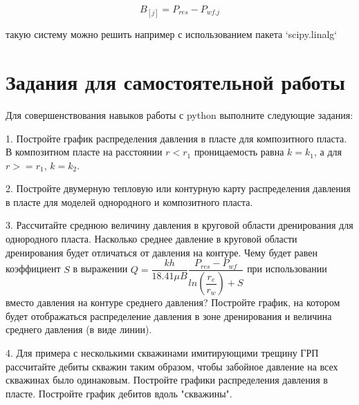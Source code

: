 $$
B_{[j]}=P_{res} - P_{wf.j}
$$

такую систему можно решить например с использованием пакета `scipy.linalg` 

\section{Задания для самостоятельной работы}

Для совершенствования навыков работы с python выполните следующие задания:

1. Постройте график распределения давления в пласте для композитного пласта. В композитном пласте на расстоянии $r<r_1$ проницаемость равна $k=k_1$, а для $r>=r_1$, $k=k_2$. 

2. Постройте двумерную тепловую или контурную карту распределения давления в пласте для моделей однородного и композитного пласта.

3. Рассчитайте среднюю величину давления в круговой области дренирования для однородного пласта. Насколько среднее давление в круговой области дренирования будет отличаться от давления на контуре. Чему будет равен коэффициент $S$ в выражении  $Q=\dfrac{kh}{18.41\mu B} \dfrac{P_{res}-P_{wf}}{ln(\dfrac{r_e}{r_w})+S}$ при использовании вместо давления на контуре среднего давления? Постройте график, на котором будет отображаться распределение давления в зоне дренирования и величина среднего давления (в виде линии).

4. Для примера с несколькими скважинами имитирующими трещину ГРП рассчитайте дебиты скважин таким образом, чтобы забойное давление на всех скважинах было одинаковым. Постройте графики распределения давления в пласте. Постройте график дебитов вдоль "скважины".

